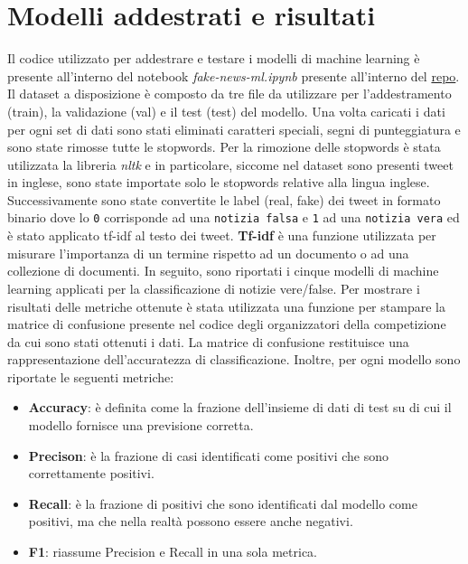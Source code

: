 \documentclass{article}
\begin{document}
\section{Modelli addestrati e risultati}
Il codice utilizzato per addestrare e testare i modelli di machine learning è presente all'interno del notebook \textit{fake-news-ml.ipynb} presente all'interno del \href{https://github.com/mgranchelli/covid19-fake-news-detection}{repo}. Il dataset a disposizione è composto da tre file da utilizzare per l'addestramento (train), la validazione (val) e il test (test) del modello. Una volta caricati i dati per ogni set di dati sono stati eliminati caratteri speciali, segni di punteggiatura e sono state rimosse tutte le stopwords. Per la rimozione delle stopwords è stata utilizzata la libreria \textit{nltk} e in particolare, siccome nel dataset sono presenti tweet in inglese, sono state importate solo le stopwords relative alla lingua inglese. Successivamente sono state convertite le label (real, fake) dei tweet in formato binario dove lo \texttt{0} corrisponde ad una \texttt{notizia falsa} e \texttt{1} ad una \texttt{notizia vera} ed è stato applicato tf-idf al testo dei tweet. \textbf{Tf-idf} è una funzione utilizzata per misurare l'importanza di un termine rispetto ad un documento o ad una collezione di documenti. In seguito, sono riportati i cinque modelli di machine learning applicati per la classificazione di notizie vere/false. Per mostrare i risultati delle metriche ottenute è stata utilizzata una funzione per stampare la matrice di confusione presente nel codice degli organizzatori della competizione da cui sono stati ottenuti i dati. La matrice di confusione restituisce una rappresentazione dell'accuratezza di classificazione. Inoltre, per ogni modello sono riportate le seguenti metriche:
\begin{itemize}[noitemsep]
  \item \textbf{Accuracy}: è definita come la frazione dell'insieme di dati di test su di cui il modello fornisce una previsione corretta.
  \item \textbf{Precison}:  è la frazione di casi identificati come positivi che sono correttamente positivi.
  \item \textbf{Recall}:  è la frazione di positivi che sono identificati dal modello come positivi, ma che nella realtà possono essere anche negativi.
  \item \textbf{F1}: riassume Precision e Recall in una sola metrica.
 \end{itemize}
\end{document}
